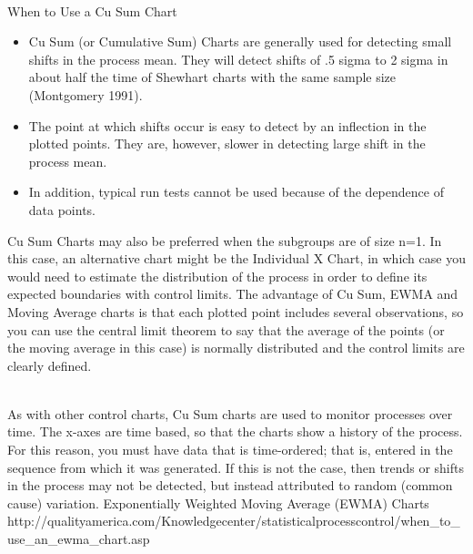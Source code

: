 \begin{frame}\\
When to Use a Cu Sum Chart

\begin{itemize}
\item Cu Sum (or Cumulative Sum) Charts are generally used for detecting small shifts in the process mean. They will detect shifts of .5 sigma to 2 sigma in about half the time of Shewhart charts with the same sample size (Montgomery 1991). 
\item The point at which shifts occur is easy to detect by an inflection in the plotted points. They are, however, slower in detecting large shift in the process mean. 
\item In addition, typical run tests cannot be used because of the dependence of data points.
\end{itemize}
\end{frame}
\begin{frame}
Cu Sum Charts may also be preferred when the subgroups are of size n=1. In this case, an alternative chart might be the Individual X Chart, in which case you would need to estimate the distribution of the process in order to define its expected boundaries with control limits. The advantage of Cu Sum, EWMA and Moving Average charts is that each plotted point includes several observations, so you can use the central limit theorem to say that the average of the points (or the moving average in this case) is normally distributed and the control limits are clearly defined.
\end{frame}
\begin{frame}\\
As with other control charts, Cu Sum charts are used to monitor processes over time. The x-axes are time based, so that the charts show a history of the process. For this reason, you must have data that is time-ordered; that is, entered in the sequence from which it was generated. If this is not the case, then trends or shifts in the process may not be detected, but instead attributed to random (common cause) variation.
Exponentially Weighted Moving Average (EWMA) Charts
http://qualityamerica.com/Knowledgecenter/statisticalprocesscontrol/when_to_use_an_ewma_chart.asp
\end{frame}
